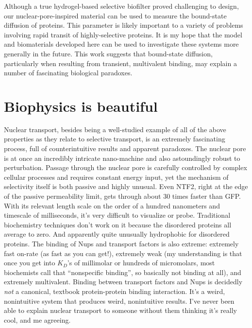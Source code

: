 Although a true hydrogel-based selective biofilter proved challenging to design, our nuclear-pore-inspired material can be used to measure the bound-state diffusion of proteins.  This parameter is likely important to a variety of problems involving rapid transit of highly-selective proteins.  It is my hope that the model and biomaterials developed here can be used to investigate these systems more generally in the future.  This work suggests that bound-state diffusion, particularly when resulting from transient, multivalent binding, may explain a number of fascinating biological paradoxes.

\section{Biophysics is beautiful}

Nuclear transport, besides being a well-studied example of all of the above properties as they relate to selective transport, is an extremely fascinating process, full of counterintuitive results and apparent paradoxes.  The nuclear pore is at once an incredibly intricate nano-machine and also astoundingly robust to perturbation.  Passage through the nuclear pore is carefully controlled by complex cellular processes and requires constant energy input, yet the mechanism of selectivity itself is both passive and highly unusual.  Even NTF2, right at the edge of the passive permeability limit, gets through about 30 times faster than GFP.  With its relevant length scale on the order of a hundred nanometers and timescale of milliseconds, it's very difficult to visualize or probe.  Traditional biochemistry techniques don't work on it because the disordered proteins all average to zero.  And apparently quite unusually hydrophobic for disordered proteins.  The binding of Nups and transport factors is also extreme: extremely fast on-rate (as fast as you can get!), extremely weak (my understanding is that once you get into $K_D$'s of millimolar or hundreds of micromolars, most biochemists call that ``nonspecific binding'', so basically not binding at all), and extremely multivalent.  Binding between transport factors and Nups is decidedly \textit{not} a canonical, textbook protein-protein binding interaction.   It's a weird, nonintuitive system that produces weird, nonintuitive results.  I've never been able to explain nuclear transport to someone without them thinking it's really cool, and me agreeing.


